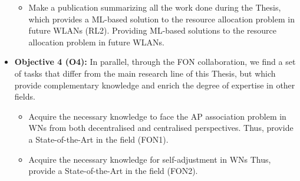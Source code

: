 \documentclass[12pt, a4paper,twoside]{tesi_upf}
\begin{document}
\begin{itemize}
\begin{itemize}
				\item Make a publication summarizing all the work done during the Thesis, which provides a ML-based solution to the resource allocation problem in future WLANs (RL2). Providing ML-based solutions to the resource allocation problem in future WLANs.
			\end{itemize}	
			\item \textbf{Objective 4 (O4):} In parallel, through the FON collaboration, we find a set of tasks that differ from the main research line of this Thesis, but which provide complementary knowledge and enrich the degree of expertise in other fields.
			\begin{itemize}
				\item Acquire the necessary knowledge to face the AP association problem in WNs from both decentralised and centralised perspectives. Thus, provide a State-of-the-Art in the field (FON1).
				\item Acquire the necessary knowledge for self-adjustment in WNs Thus, provide a State-of-the-Art in the field (FON2).
			\end{itemize}		
		\end{itemize}
	
\end{document}

